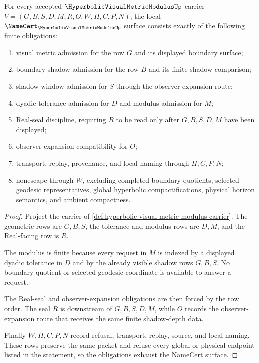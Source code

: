 \begin{theorem}
\label{thm:hyperbolic-visual-metric-modulus-namecert-obligations}
For every accepted $\HyperbolicVisualMetricModulusUp$ carrier $V=(G,B,S,D,M,R,O,W,H,C,P,N)$, the local $\NameCert_{\HyperbolicVisualMetricModulusUp}$ surface consists exactly of the following finite obligations:
\begin{enumerate}
\item visual metric admission for the row $G$ and its displayed boundary surface;
\item boundary-shadow admission for the row $B$ and its finite shadow comparison;
\item shadow-window admission for $S$ through the observer-expansion route;
\item dyadic tolerance admission for $D$ and modulus admission for $M$;
\item Real-seal discipline, requiring $R$ to be read only after $G,B,S,D,M$ have been displayed;
\item observer-expansion compatibility for $O$;
\item transport, replay, provenance, and local naming through $H,C,P,N$;
\item nonescape through $W$, excluding completed boundary quotients, selected geodesic representatives, global hyperbolic compactifications, physical horizon semantics, and ambient compactness.
\end{enumerate}
\end{theorem}
\begin{proof}
Project the carrier of \autoref{def:hyperbolic-visual-metric-modulus-carrier}. The geometric rows are $G,B,S$, the tolerance and modulus rows are $D,M$, and the Real-facing row is $R$.

The modulus is finite because every request in $M$ is indexed by a displayed dyadic tolerance in $D$ and by the already visible shadow rows $G,B,S$. No boundary quotient or selected geodesic coordinate is available to answer a request.

The Real-seal and observer-expansion obligations are then forced by the row order. The seal $R$ is downstream of $G,B,S,D,M$, while $O$ records the observer-expansion route that receives the same finite shadow-depth data.

Finally $W,H,C,P,N$ record refusal, transport, replay, source, and local naming. These rows preserve the same packet and refuse every global or physical endpoint listed in the statement, so the obligations exhaust the NameCert surface.
\end{proof}

